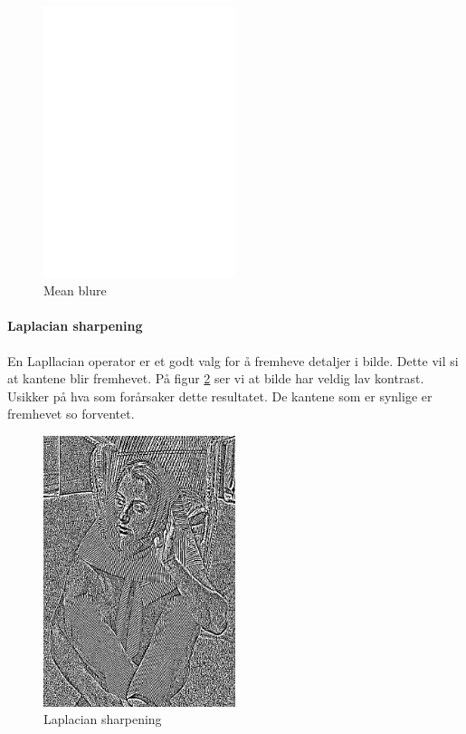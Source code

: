 \documentclass[a4paper, 12pt]{article}
\begin{document}
\begin{figure}[h]
  \centering
  \includegraphics[width=0.5\textwidth]{images/barbara-mean-blure}
  \caption{Mean blure}
  \label{fig:barbara-mean-blure}
\end{figure}

\paragraph{Laplacian sharpening}
En Lapllacian operator er et godt valg for å fremheve detaljer i bilde. Dette vil si at kantene blir fremhevet. På figur \ref{fig:laplacian-sharpening} ser vi at bilde har veldig lav kontrast. Usikker på hva som forårsaker dette resultatet. De kantene som er synlige er fremhevet so forventet.

\begin{figure}[h]
  \centering
  \includegraphics[width=0.5\textwidth]{images/laplacian-sharpening}
  \caption{Laplacian sharpening}
  \label{fig:laplacian-sharpening}
\end{figure}
\end{document}

